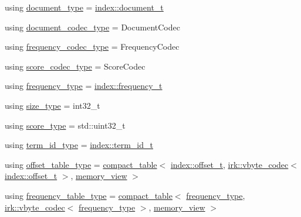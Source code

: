 \begin{DoxyCompactItemize}
\item 
using \mbox{\hyperlink{classirk_1_1basic__inverted__index__view_aa687d7f6babce15088ca5792a6fbb9b3}{document\+\_\+type}} = \mbox{\hyperlink{namespaceirk_1_1index_af829dedea20da89f9b51b49d78f57006}{index\+::document\+\_\+t}}
\item 
using \mbox{\hyperlink{classirk_1_1basic__inverted__index__view_a90415f73bd983f8a661d5502134d334f}{document\+\_\+codec\+\_\+type}} = Document\+Codec
\item 
using \mbox{\hyperlink{classirk_1_1basic__inverted__index__view_a3d985daf7381825ddf7788611d03cb8f}{frequency\+\_\+codec\+\_\+type}} = Frequency\+Codec
\item 
using \mbox{\hyperlink{classirk_1_1basic__inverted__index__view_a1ab4b8054127c66df13fc39d22d316ad}{score\+\_\+codec\+\_\+type}} = Score\+Codec
\item 
using \mbox{\hyperlink{classirk_1_1basic__inverted__index__view_a01218db8d72e7ee07f3a9f71225f03c8}{frequency\+\_\+type}} = \mbox{\hyperlink{namespaceirk_1_1index_aa2cb48e79abd95deb25bbdf36c0ea70f}{index\+::frequency\+\_\+t}}
\item 
using \mbox{\hyperlink{classirk_1_1basic__inverted__index__view_a57ae4c0a2a602340c31996d3e240be46}{size\+\_\+type}} = int32\+\_\+t
\item 
using \mbox{\hyperlink{classirk_1_1basic__inverted__index__view_a4ce80db3851ca86612fa854329c45142}{score\+\_\+type}} = std\+::uint32\+\_\+t
\item 
using \mbox{\hyperlink{classirk_1_1basic__inverted__index__view_a6b272abc76df208ce59bac93810e7331}{term\+\_\+id\+\_\+type}} = \mbox{\hyperlink{namespaceirk_1_1index_ae2ce3a02969196fe6dab4443ed2007d5}{index\+::term\+\_\+id\+\_\+t}}
\item 
using \mbox{\hyperlink{classirk_1_1basic__inverted__index__view_ad9f3d11fa37ab4d1ce1b47a579466589}{offset\+\_\+table\+\_\+type}} = \mbox{\hyperlink{classirk_1_1compact__table}{compact\+\_\+table}}$<$ \mbox{\hyperlink{namespaceirk_1_1index_ad66c0e72549ffc6b78a85158293bb47b}{index\+::offset\+\_\+t}}, \mbox{\hyperlink{structirk_1_1vbyte__codec}{irk\+::vbyte\+\_\+codec}}$<$ \mbox{\hyperlink{namespaceirk_1_1index_ad66c0e72549ffc6b78a85158293bb47b}{index\+::offset\+\_\+t}} $>$, \mbox{\hyperlink{classirk_1_1memory__view}{memory\+\_\+view}} $>$
\item 
using \mbox{\hyperlink{classirk_1_1basic__inverted__index__view_a61954abd58d702c89a299a0e3ab78104}{frequency\+\_\+table\+\_\+type}} = \mbox{\hyperlink{classirk_1_1compact__table}{compact\+\_\+table}}$<$ \mbox{\hyperlink{classirk_1_1basic__inverted__index__view_a01218db8d72e7ee07f3a9f71225f03c8}{frequency\+\_\+type}}, \mbox{\hyperlink{structirk_1_1vbyte__codec}{irk\+::vbyte\+\_\+codec}}$<$ \mbox{\hyperlink{classirk_1_1basic__inverted__index__view_a01218db8d72e7ee07f3a9f71225f03c8}{frequency\+\_\+type}} $>$, \mbox{\hyperlink{classirk_1_1memory__view}{memory\+\_\+view}} $>$

\end{DoxyCompactItemize}
